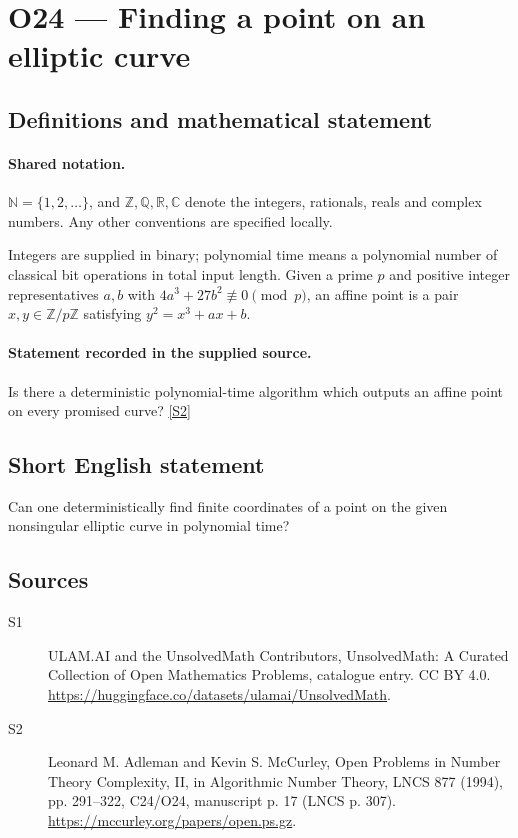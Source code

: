 \documentclass[11pt]{article}
\newcommand{\sref}[2]{\hyperlink{source:#1:#2}{[S#2]}}
\begin{document}
\section{O24 — Finding a point on an elliptic curve}\label{statement}

\subsection{Definitions and mathematical statement}

\paragraph{Shared notation.}$\mathbb N=\{1,2,\ldots\}$, and $\mathbb Z,\mathbb Q,\mathbb R,\mathbb C$ denote the integers, rationals, reals and complex numbers. Any other conventions are specified locally.


Integers are supplied in binary; polynomial time means a polynomial number of classical bit operations in total input length. Given a prime $p$ and positive integer representatives $a,b$ with $4a^3+27b^2\not\equiv0\pmod p$, an affine point is a pair $x,y\in\mathbb Z/p\mathbb Z$ satisfying $y^2=x^3+ax+b$.
\paragraph{Statement recorded in the supplied source.}
Is there a deterministic polynomial-time algorithm which outputs an affine point on every promised curve? \sref{statement}{2}
\subsection{Short English statement}
Can one deterministically find finite coordinates of a point on the given nonsingular elliptic curve in polynomial time?
\subsection{Sources}
\begin{description}
\item[\hypertarget{source:statement:1}{S1}] ULAM.AI and the UnsolvedMath Contributors, UnsolvedMath: A Curated Collection of Open Mathematics Problems, catalogue entry. CC BY 4.0. \url{https://huggingface.co/datasets/ulamai/UnsolvedMath}.
\item[\hypertarget{source:statement:2}{S2}] Leonard M. Adleman and Kevin S. McCurley, Open Problems in Number Theory Complexity, II, in Algorithmic Number Theory, LNCS 877 (1994), pp. 291--322, C24/O24, manuscript p. 17 (LNCS p. 307). \url{https://mccurley.org/papers/open.ps.gz}.
\end{description}
\label{end:statement}
\end{document}
